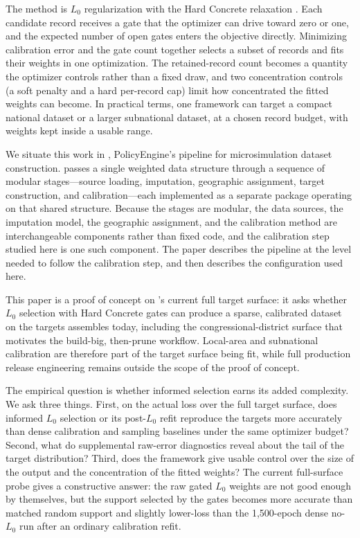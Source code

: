 The method is $L_0$ regularization with the Hard Concrete relaxation \citep{louizos2018}. Each
candidate record receives a gate that the optimizer can drive toward zero or one, and the expected
number of open gates enters the objective directly. Minimizing calibration error and the gate count
together selects a subset of records and fits their weights in one optimization. The retained-record
count becomes a quantity the optimizer controls rather than a fixed draw, and two concentration
controls (a soft penalty and a hard per-record cap) limit how concentrated the fitted weights can
become. In practical terms, one framework can target a compact national dataset or a larger subnational
dataset, at a chosen record budget, with weights kept inside a usable range.

We situate this work in \populace{} \citep{populace2026}, PolicyEngine's pipeline for microsimulation
dataset construction. \populace{} passes a single weighted data structure through a sequence of
modular stages---source loading, imputation, geographic assignment, target construction, and
calibration---each implemented as a separate package operating on that shared structure. Because the
stages are modular, the data sources, the imputation model, the geographic assignment, and the
calibration method are interchangeable components rather than fixed code, and the calibration step
studied here is one such component. The paper describes the pipeline at the level needed to follow the
calibration step, and then describes the configuration used here.

This paper is a proof of concept on \populace{}'s current full target surface: it asks whether
$L_0$ selection with Hard Concrete gates can produce a sparse, calibrated dataset on the targets
\populace{} assembles today, including the congressional-district surface that motivates the build-big,
then-prune workflow. Local-area and subnational calibration are therefore part of the target surface being
fit, while full production release engineering remains outside the scope of the proof of concept.

The empirical question is whether informed selection earns its added complexity. We ask three
things. First, on the actual \populace{} loss over the full target surface, does informed $L_0$ selection
or its post-$L_0$ refit reproduce the targets more accurately than dense calibration and sampling
baselines under the same optimizer budget? Second, what do supplemental raw-error diagnostics reveal about
the tail of the target distribution? Third, does the framework give usable control over the size of the
output and the concentration of the fitted weights? The current full-surface probe gives a constructive
answer: the raw gated $L_0$ weights are not good enough by themselves, but the support selected by the
gates becomes more accurate than matched random support and slightly lower-loss than the 1{,}500-epoch
dense no-$L_0$ run after an ordinary calibration refit.

